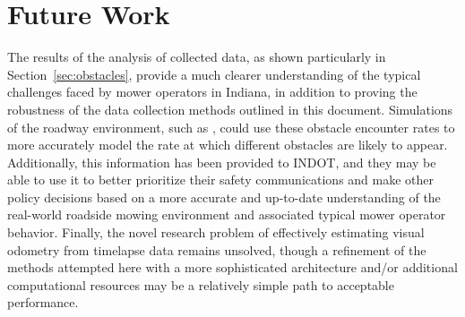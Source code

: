 \documentclass[
]{article}
\begin{document}
\chapter{Future Work}\label{future-work}

The results of the analysis of collected data, as shown particularly in
Section~\ref{sec:obstacles}, provide a much clearer understanding of the
typical challenges faced by mower operators in Indiana, in addition to
proving the robustness of the data collection methods outlined in this
document. Simulations of the roadway environment, such as
\textcite{Mardikes_ConstructingDigitalTwin_2025}, could use these
obstacle encounter rates to more accurately model the rate at which
different obstacles are likely to appear. Additionally, this information
has been provided to INDOT, and they may be able to use it to better
prioritize their safety communications and make other policy decisions
based on a more accurate and up-to-date understanding of the real-world
roadside mowing environment and associated typical mower operator
behavior. Finally, the novel research problem of effectively estimating
visual odometry from timelapse data remains unsolved, though a
refinement of the methods attempted here with a more sophisticated
architecture and/or additional computational resources may be a
relatively simple path to acceptable performance.

\clearpage

\printbibliography[title=References]
\end{document}
